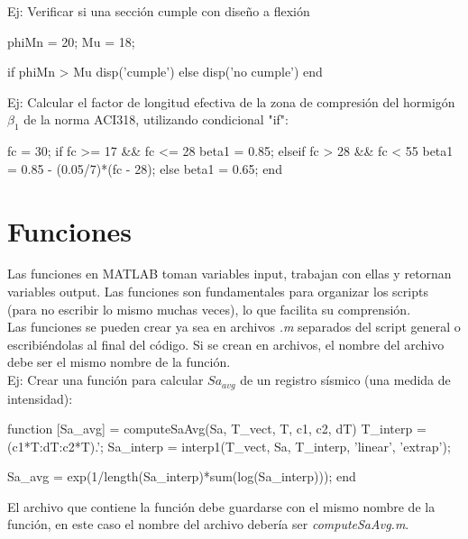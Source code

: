 Ej: Verificar si una sección cumple con diseño a flexión
\begin{verbatimg}
    phiMn = 20;     %
    Mu = 18;        %
    
    if phiMn > Mu  
        disp('cumple')
    else
        disp('no cumple')
    end
\end{verbatimg}

Ej: Calcular el factor de longitud efectiva de la zona de compresión del hormigón $\beta_1$ de la norma ACI318, utilizando condicional "if":
\begin{verbatimg}
    fc = 30; %
    if fc >= 17 && fc <= 28 %
        beta1 = 0.85;
    elseif fc > 28 && fc < 55 %
        beta1 = 0.85 - (0.05/7)*(fc - 28);
    else %
        beta1 = 0.65;
    end
\end{verbatimg}

\section{Funciones}
Las funciones en MATLAB toman variables input, trabajan con ellas y retornan variables output. Las funciones son fundamentales para organizar los scripts (para no escribir lo mismo muchas veces), lo que facilita su comprensión. \\

\noindent Las funciones se pueden crear ya sea en archivos \emph{.m} separados del script general o escribiéndolas al final del código. Si se crean en archivos, el nombre del archivo debe ser el mismo nombre de la función. \\

Ej: Crear una función para calcular $Sa_{avg}$ de un registro sísmico (una medida de intensidad):
\begin{verbatimg}
    function [Sa_avg] = computeSaAvg(Sa, T_vect, T, c1, c2, dT)
        T_interp = (c1*T:dT:c2*T).';
        Sa_interp = interp1(T_vect, Sa, T_interp, 'linear', 'extrap');
        
        Sa_avg = exp(1/length(Sa_interp)*sum(log(Sa_interp)));
    end
\end{verbatimg}

\noindent El archivo que contiene la función debe guardarse con el mismo nombre de la función, en este caso el nombre del archivo debería ser \emph{computeSaAvg.m}. \\


